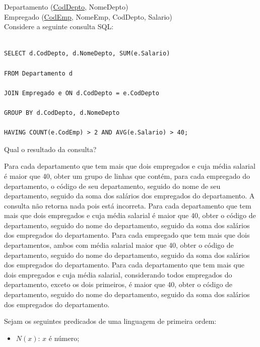\documentclass[12pt, addpoints]{exam}
\begin{document}
\begin{questions}
Departamento (\underline{CodDepto}, NomeDepto)\\

Empregado (\underline{CodEmp}, NomeEmp, CodDepto, Salario)\\

Considere a seguinte consulta SQL:

\begin{verbatim}

SELECT d.CodDepto, d.NomeDepto, SUM(e.Salario)

FROM Departamento d

JOIN Empregado e ON d.CodDepto = e.CodDepto

GROUP BY d.CodDepto, d.NomeDepto

HAVING COUNT(e.CodEmp) > 2 AND AVG(e.Salario) > 40;

\end{verbatim}



Qual o resultado da consulta?
\begin{choices}
\choice Para cada departamento que tem mais que dois empregados e cuja média salarial é maior que 40, obter um grupo de linhas que contém, para cada empregado do departamento, o código de seu departamento, seguido do nome de seu departamento, seguido da soma dos salários dos empregados do departamento.
\choice A consulta não retorna nada pois está incorreta.
\choice Para cada departamento que tem mais que dois empregados e cuja média salarial é maior que 40, obter o código de departamento, seguido do nome do departamento, seguido da soma dos salários dos empregados do departamento.
\choice Para cada empregado que tem mais que dois departamentos, ambos com média salarial maior que 40, obter o código de departamento, seguido do nome do departamento, seguido da soma dos salários dos empregados do departamento.
\choice Para cada departamento que tem mais que dois empregados e cuja média salarial, considerando todos empregados do departamento, exceto os dois primeiros, é maior que 40, obter o código de departamento, seguido do nome do departamento, seguido da soma dos salários dos empregados do departamento.
\end{choices}

\question

Sejam os seguintes predicados de uma linguagem de primeira ordem:



\begin{itemize}

    \item \( N(x) \): \( x \) é número;


\end{itemize}
\end{questions}
\end{document}
